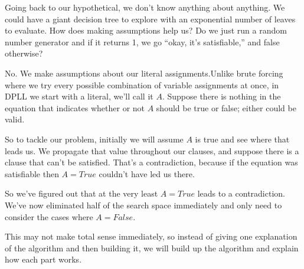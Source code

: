 Going back to our hypothetical, we don't know anything about anything. We
could have a giant decision tree to explore with an exponential number of leaves
to evaluate. How does making assumptions help us? Do we just run a random number generator 
and if it returns 1, we go ``okay, it's satisfiable,'' and false otherwise?

No. We make assumptions about our literal assignments.Unlike brute forcing where we try 
every possible combination of variable assignments at once, in DPLL we start with a literal, 
we'll call it $A$. Suppose there is nothing in the equation that indicates whether or not 
$A$ should be true or false; either could be valid.

So to tackle our problem, initially we will assume $A$ is true and see where
that leads us. We propagate that value throughout our clauses, and suppose
there is a clause that can't be satisfied. That's a contradiction, because if the
equation was satisfiable then $A = True$ couldn't have led us there.

So we've figured out that at the very least $A = True$ leads to a
contradiction. We've now eliminated half of the search space immediately and only need to
consider the cases where $A = False$.

This may not make total sense immediately, so instead of giving one explanation
of the algorithm and then building it, we will build up the algorithm and explain
how each part works.